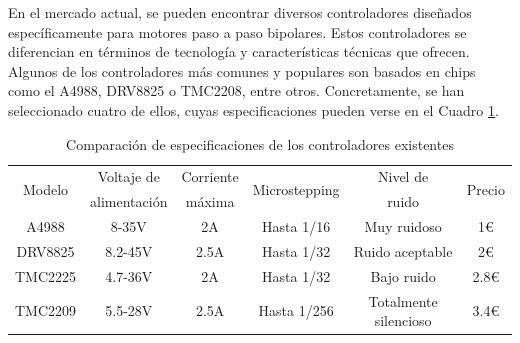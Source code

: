 En el mercado actual, se pueden encontrar diversos controladores diseñados específicamente para motores paso a paso bipolares. Estos 
controladores se diferencian en términos de tecnología y características técnicas que ofrecen. Algunos de los controladores más comunes 
y populares son basados en chips como el A4988, DRV8825 o TMC2208, entre otros. Concretamente, se han seleccionado cuatro de ellos, cuyas 
especificaciones pueden verse en el Cuadro \ref{cuad:controladores}.
\begin{table}[htbp]
  \centering
  \caption{Comparación de especificaciones de los controladores existentes}
  \label{cuad:controladores}
  \begin{tabular}{|c|c|c|c|c|c|}
      \hline
      \multirow{2}{*}{Modelo} & Voltaje de & Corriente & \multirow{2}{*}{Microstepping} & Nivel de & \multirow{2}{*}{Precio} \\
                             & alimentación & máxima & & ruido &\\
      \hline
      A4988 & 8-35V & 2A & Hasta 1/16 & Muy ruidoso & 1\euro \\
      \hline
      DRV8825 & 8.2-45V & 2.5A & Hasta 1/32 & Ruido aceptable & 2\euro \\
      \hline
      TMC2225 & 4.7-36V & 2A & Hasta 1/32 & Bajo ruido  & 2.8\euro \\
      \hline
      TMC2209 & 5.5-28V & 2.5A & Hasta 1/256 & Totalmente silencioso & 3.4\euro \\
      \hline
  \end{tabular}
\end{table}
